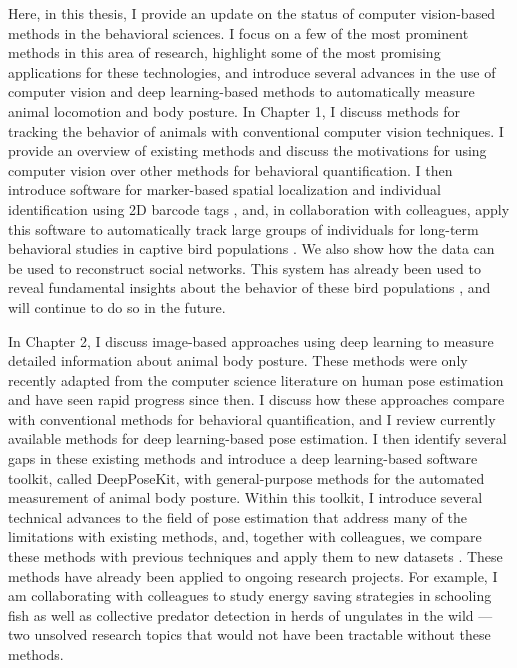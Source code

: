 Here, in this thesis, I provide an update on the status of computer vision-based methods in the behavioral sciences. I focus on a few of the most prominent methods in this area of research, highlight some of the most promising applications for these technologies, and introduce several advances in the use of computer vision and deep learning-based methods to automatically measure animal locomotion and body posture. In Chapter 1, I discuss methods for tracking the behavior of animals with conventional computer vision techniques. I provide an overview of existing methods and discuss the motivations for using computer vision over other methods for behavioral quantification. I then introduce software for marker-based spatial localization and individual identification using 2D barcode tags \citep{graving2017pinpoint}, and, in collaboration with colleagues, apply this software to automatically track large groups of individuals for long-term behavioral studies in captive bird populations \citep{alarcon2018automated}. We also show how the data can be used to reconstruct social networks. This system has already been used to reveal fundamental insights about the behavior of these bird populations \citep{maldonado2018experimental}, and will continue to do so in the future. 

In Chapter 2, I discuss image-based approaches using deep learning to measure detailed information about animal body posture. These methods were only recently adapted from the computer science literature on human pose estimation and have seen rapid progress since then. I discuss how these approaches compare with conventional methods for behavioral quantification, and I review currently available methods for deep learning-based pose estimation. I then identify several gaps in these existing methods and introduce a deep learning-based software toolkit, called DeepPoseKit, with general-purpose methods for the automated measurement of animal body posture. Within this toolkit, I introduce several technical advances to the field of pose estimation that address many of the limitations with existing methods, and, together with colleagues, we compare these methods with previous techniques and apply them to new datasets \citep{graving2019deepposekit}. These methods have already been applied to ongoing research projects. For example, I am collaborating with colleagues to study energy saving strategies in schooling fish as well as collective predator detection in herds of ungulates in the wild --- two unsolved research topics that would not have been tractable without these methods.

